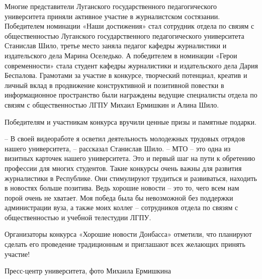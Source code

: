 Многие представители Луганского государственного педагогического университета
приняли активное участие в журналистском состязании. Победителем номинации
«Наши достижения» стал сотрудник отдела по связям с общественностью Луганского
государственного педагогического университета Станислав Шило, третье место
заняла педагог кафедры журналистики и издательского дела Марина Оселедько. А
победителем в номинации «Герои современности» стала студент кафедры
журналистики и издательского дела Дария Беспалова. Грамотами за участие в
конкурсе, творческий потенциал, креатив и личный вклад в продвижение
конструктивной и позитивной повестки в информационное пространство были
награждены ведущие специалисты отдела по связям с общественностью ЛГПУ Михаил
Ермишкин и Алина Шило.


Победителям и участникам конкурса вручили ценные призы и памятные подарки.

\begin{zznagolos}
– В своей видеоработе я осветил деятельность молодежных трудовых отрядов
нашего университета, – рассказал Станислав Шило. – МТО – это одна из визитных
карточек нашего университета. Это  и  первый шаг  на пути к обретению профессии
для многих студентов. Такие  конкурсы  очень важны для развития журналистики в
Республике. Они стимулируют  трудиться и развиваться, находить в новостях
больше позитива. Ведь хорошие новости – это то, чего всем нам порой очень не
хватает. Моя победа была бы невозможной без поддержки администрации вуза, а
также моих коллег – сотрудников отдела по связям с общественностью и учебной
телестудии ЛГПУ.
\end{zznagolos}

Организаторы конкурса «Хорошие новости Донбасса» отметили, что планируют
сделать его проведение традиционным и приглашают всех желающих принять участие!

Пресс-центр университета, фото Михаила Ермишкина
